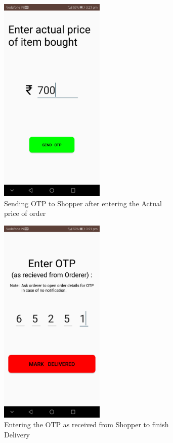 \documentclass{report}
\begin{document}
\begin{figure}[h!]
\begin{subfigure}[h!]{.3\textwidth}
\centering
\includegraphics[width=5cm]{send_otp.jpg}
\caption{\centering Sending OTP to Shopper after entering the Actual price of order}
\end{subfigure}
\begin{subfigure}[h!]{.3\textwidth}
\centering
\includegraphics[width=5cm]{mark_delivered.jpg}
\caption{\centering Entering the OTP as received from Shopper to finish Delivery}
\end{subfigure}
\begin{subfigure}[h!]{.3\textwidth}
\centering

\end{subfigure}
\end{figure}
\end{document}
